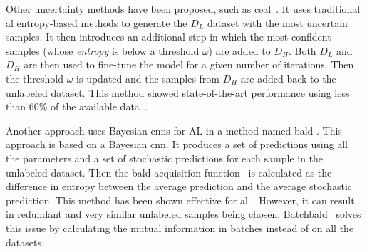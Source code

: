     Other uncertainty methods have been proposed, such as \acrfull{ceal}~\cite{wang2016cost}.
    It uses traditional \acrshort{al} entropy-based methods to generate the $D_L$ dataset with the most uncertain samples. It then introduces an additional step in which the most confident samples (whose \emph{entropy} is below a threshold $\omega$) are added to $D_H$. Both $D_L$ and $D_H$ are then used to fine-tune the model for a given number of iterations. Then the threshold $\omega$ is updated and the samples from $D_H$ are added back to the unlabeled dataset.
    This method showed state-of-the-art performance using less than 60\% of the available data~\cite{wang2016cost}.
    
    
    Another approach uses Bayesian \acrshort{cnn}s for AL in a method named \acrfull{bald} \cite{gal2017deep}.
    This approach is based on a Bayesian \acrshort{cnn}. It produces a set of predictions using all the parameters and a set of stochastic predictions for each sample in the unlabeled dataset. Then the \acrshort{bald} acquisition function~\cite{houlsby2011bayesian} is calculated as the difference in entropy between the average prediction and the average stochastic prediction.
    This method has been shown effective for \acrshort{al}~\cite{gal2016dropout}. However, it can result in redundant and very similar unlabeled samples being chosen. Batch\acrshort{bald}~\cite{kirsch2019batchbald} solves this issue by calculating the mutual information in batches instead of on all the datasets. 
    
    
